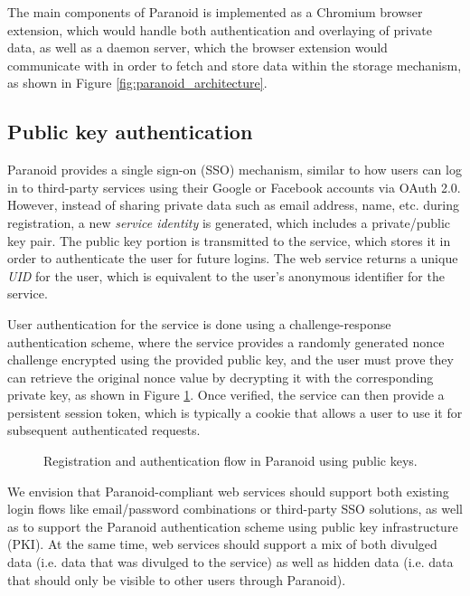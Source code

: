 \documentclass[letterpaper,twocolumn,10pt]{article}
\begin{document}
The main components of Paranoid is implemented as a Chromium browser extension, which would handle both authentication and overlaying of private data, as well as a daemon server, which the browser extension would communicate with in order to fetch and store data within the storage mechanism, as shown in Figure \ref{fig:paranoid_architecture}.

\subsection{Public key authentication}

Paranoid provides a single sign-on (SSO) mechanism, similar to how users can log in to third-party services using their Google or Facebook accounts via OAuth 2.0. However, instead of sharing private data such as email address, name, etc. during registration, a new \textit{service identity} is generated, which includes a private/public key pair. The public key portion is transmitted to the service, which stores it in order to authenticate the user for future logins. The web service returns a unique \textit{UID} for the user, which is equivalent to the user's anonymous identifier for the service.

User authentication for the service is done using a challenge-response authentication scheme, where the service provides a randomly generated nonce challenge encrypted using the provided public key, and the user must prove they can retrieve the original nonce value by decrypting it with the corresponding private key, as shown in Figure \ref{fig:paranoid_auth}. Once verified, the service can then provide a persistent session token, which is typically a cookie that allows a user to use it for subsequent authenticated requests.

\begin{figure}
    \centering
    \def\svgwidth{\columnwidth}
    
    \caption{Registration and authentication flow in Paranoid using public keys.}
    \label{fig:paranoid_auth}
\end{figure}

We envision that Paranoid-compliant web services should support both existing login flows like email/password combinations or third-party SSO solutions, as well as to support the Paranoid authentication scheme using public key infrastructure (PKI). At the same time, web services should support a mix of both divulged data (i.e. data that was divulged to the service) as well as hidden data (i.e. data that should only be visible to other users through Paranoid).
\end{document}
